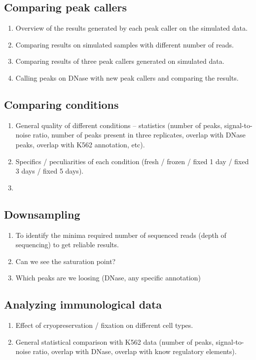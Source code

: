 \documentclass[11pt]{article}
\begin{document}
\subsection{Comparing peak callers}
\begin{enumerate}
\itemsep0em
  \item Overview of the results generated by each peak caller on the 
         simulated data.
  \item Comparing results on simulated samples with different number of 
         reads.
  \item Comparing results of three peak callers generated on simulated 
         data.
  \item Calling peaks on DNase with new peak callers and comparing the results.
\end{enumerate}

\subsection{Comparing conditions}
\begin{enumerate}
\itemsep0em
  \item General quality of different conditions -- statistics (number of peaks,
         signal-to-noise ratio, number of peaks present in three replicates, overlap 
         with DNase peaks, overlap with K562 annotation, etc).
  \item Specifics / peculiarities of each condition (fresh / frozen / fixed 1 day /
         fixed 3 days / fixed 5 days).
  \item 
\end{enumerate}

\subsection{Downsampling}
\begin{enumerate}
\itemsep0em
  \item To identify the minima required number of sequenced reads (depth of
         sequencing) to get reliable results.
  \item Can we see the saturation point?
  \item Which peaks are we loosing (DNase, any specific annotation)
\end{enumerate}

\subsection{Analyzing immunological data}
\begin{enumerate}
\itemsep0em
  \item Effect of cryopreservation / fixation on different cell types.
  \item General statistical comparison with K562 data (number of peaks,
         signal-to-noise ratio, overlap with DNase, overlap with know regulatory
         elements).
\end{enumerate}
\end{document}
